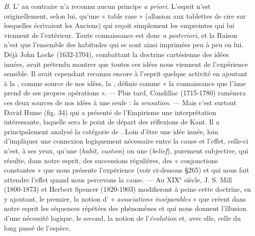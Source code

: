 {\it B.} L' au contraire n’a reconnu aucun principe {\it a priori}.
L'esprit n’est originellement, selon lui, qu’une « table rase » (allusion
aux tablettes de cire sur lesquelles écrivaient les Anciens) qui reçoit
simplement les empreintes qui lui viennent de l'extérieur. Toute
connaissance est donc {\it a posteriori}, et la Raison n’est que l’ensemble
des habitudes qui se sont ainsi imprimées peu à peu en lui. Déjà
John Locke (1632-1704), combattant la doctrine cartésienne des
idées innées, avait prétendu montrer que toutes ces idées nous viennent
de l'expérience sensible. Il avait cependant reconnu encore à l’esprit
quelque activité en ajoutant à la , comme source de nos
idées, la , définie comme « la connaissance que l’âme prend de
ses propres opérations ». — Plus tard, Condillac (1715-1780) ramènera ces deux sources de nos idées à une seule : {\it la sensation}. — Mais
c’est surtout David Hume (fig. 34) qui a présenté de l’Empirisme
une interprétation intéressante, laquelle sera le point de départ des
réflexions de Kant. Il a principalement analysé la catégorie de . Loin d'être une idée innée, loin d’impliquer une connexion logiquement nécessaire entre la cause et l’effet, celle-ci n’est, à ses yeux,
qu'une  ({\it habit, custom}) ou une  ({\it belief}), purement
subjective, qui résulte, dans notre esprit, des successions régulières,
des « conjonctions constantes » que nous présente l’expérience (voir
ci-dessous \S 265) et qui nous fait attendre l'effet quand nous percevons
la cause. — Au {\scriptsize XIX}$^\text{e}$ siècle, J. S. Mill (1800-1873) et Herbert Spencer
(1820-1903) modifieront à peine cette doctrine, en y ajoutant, le
premier, la notion d’ « {\it associations inséparables} » que créent dans notre
esprit les séquences répétées des phénomènes et qui nous donnent
l'illusion d’une nécessité logique, le second, la notion de l’{\it évolution}
et, avec elle, celle du long passé de l’espèce.
